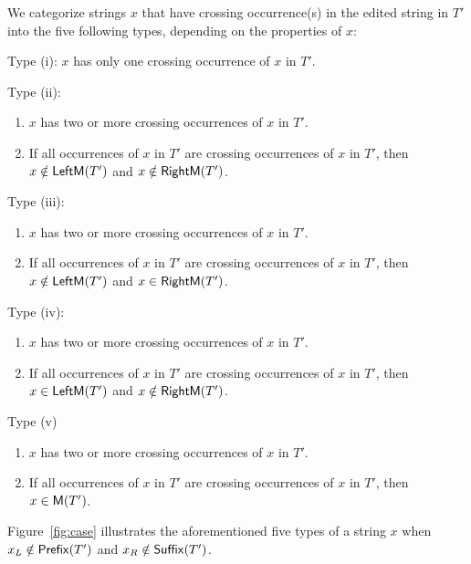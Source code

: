\begin{definition}
  We categorize strings $x$ that have crossing occurrence(s) in the edited string in $T'$ into the five following types, depending on the properties of $x$:
  \begin{description}
    \item {Type (i)}: $x$ has only one crossing occurrence of $x$ in $T'$.
    \item {Type (ii)}: 
      \begin{enumerate}
        \item $x$ has two or more crossing occurrences of $x$ in $T'$.
        \item If all occurrences of $x$ in $T'$ are crossing occurrences of $x$ in $T'$, then $x \notin \mathsf{LeftM}(T')$ and $x \notin \mathsf{RightM}(T')$.
      \end{enumerate}
    \item {Type (iii)}:
      \begin{enumerate}
        \item $x$ has two or more crossing occurrences of $x$ in $T'$.
        \item If all occurrences of $x$ in $T'$ are crossing occurrences of $x$ in $T'$, then $x \notin \mathsf{LeftM}(T')$ and $x \in \mathsf{RightM}(T')$.
      \end{enumerate}
    \item {Type (iv)}:
      \begin{enumerate}
        \item $x$ has two or more crossing occurrences of $x$ in $T'$.
        \item If all occurrences of $x$ in $T'$ are crossing occurrences of $x$ in $T'$, then $x \in \mathsf{LeftM}(T')$ and $x \notin \mathsf{RightM}(T')$.
      \end{enumerate}
    \item {Type (v)}
      \begin{enumerate}
        \item $x$ has two or more crossing occurrences of $x$ in $T'$.
        \item If all occurrences of $x$ in $T'$ are crossing occurrences of $x$ in $T'$, then $x \in \mathsf{M}(T')$.
      \end{enumerate}
  \end{description}  
\end{definition}

Figure~\ref{fig:case} illustrates the aforementioned five types of a string $x$ when $x_L \notin \mathsf{Prefix}(T')$ and $x_R \notin \mathsf{Suffix}(T')$.

